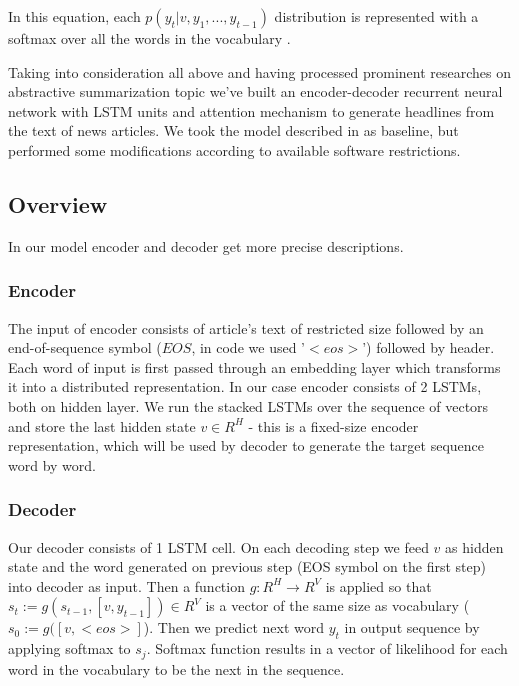 In this equation, each $p(y_t|v, y_1, ..., y_{t-1})$ distribution is represented with a softmax over all the
words in the vocabulary \cite{seq2seq_with_NN}.

Taking into consideration all above and having processed prominent researches on abstractive summarization topic we've built an encoder-decoder recurrent neural network with LSTM units and attention mechanism to generate headlines from the text of news articles. We took the model described in \cite{model-baseline-article} as baseline, but performed some modifications according to available software restrictions.

\subsection{Overview}
In our model encoder and decoder get more precise descriptions.


\subsubsection{Encoder}
The input of encoder consists of article's text of restricted size followed by an end-of-sequence symbol ($EOS$, in code we used '$<eos>$') followed by header. Each word of input is first passed through an embedding layer which transforms it into a distributed representation.
In our case encoder consists of 2 LSTMs, both on hidden layer. We run the stacked LSTMs over the sequence of vectors and store the last hidden state $v \in R^H$ - this is a fixed-size encoder representation, which will be used by decoder to generate the target sequence word by word.   


\subsubsection{Decoder}
Our decoder consists of 1 LSTM cell. On each decoding step we feed $v$ as hidden state and the word generated on previous step (EOS symbol on the first step) into decoder as input.
Then a function $g: R^H \rightarrow R^V$ is applied so that $s_t := g(s_{t-1}, [v, y_{t-1}]) \in R^V$ is a vector of the same size as vocabulary ($s_0 := g([v, <eos>]$). Then we predict next word $y_t$ in output sequence by applying softmax to $s_j$.  Softmax function results in a vector of likelihood for each word in the vocabulary to be the next in the sequence. 

